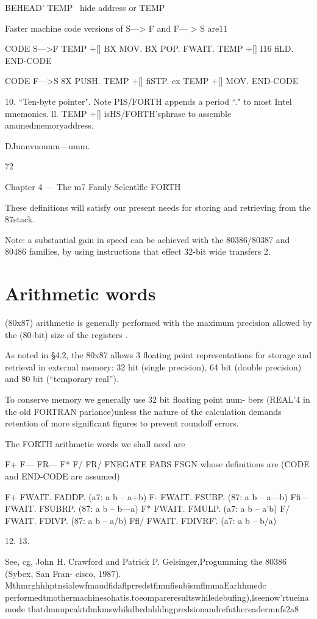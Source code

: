 {{BEHEAD' TEMP \ hide address or TEMP

Faster machine code versions of S—> F and F— > S are11

CODE S—>F TEMP +[] BX MOV. BX POP.
FWAIT. TEMP +[] I16 fiLD. END-CODE

CODE F—>S 8X PUSH. TEMP +[] fiSTP.
ex TEMP +[] MOV. END-CODE

 

10. “Ten-byte pointer". Note PIS/FORTH appends a period “." to most Intel mnemonics.
ll. TEMP +[] isHS/FORTH’sphrase to assemble anamedmemoryaddress.

DJunnvuounm—umm.

72

Chapter 4 — The m7 Famly Sclentlflc FORTH

These definitions will satisfy our present needs for storing and
retrieving from the 87stack.

Note: a substantial gain in speed can be achieved with the
80386/80387 and 80486 families, by using instructions that effect
32-bit wide transfers 2.

\section{Arithmetic words}

 (80x87) arithmetic is generally performed with the
maximum precision allowed by the (80-bit) size of the
registers .

As noted in §4.2, the 80x87 allows 3 floating point representations
for storage and retrieval in external memory: 32 hit (single precision),
64 bit (double precision) and 80 bit (“temporary real”).

To conserve memory we generally use 32 bit floating point num-
bers (REAL'4 in the old FORTRAN parlance)unless the nature
of the calculation demands retention of more significant figures
to prevent roundoff errors.

The FORTH arithmetic words we shall need are

F+ F— FR— F* F/ FR/ FNEGATE FABS FSGN
whose definitions are (CODE and END-CODE are assumed)

F+ FWAIT. FADDP. (a7: a b -- a+b)
F- FWAIT. FSUBP. (87: a b -- a—b)
Ffi— FWAIT. FSUBRP. (87: a b -- b—a)
F* FWAIT. FMULP. (a7: a b -- a'b)
F/ FWAIT. FDIVP. (87: a b -- a/b)
Ffl/ FWAIT. FDIVRF’. (a7: a b -- b/a)

 

12.
13.

See, cg, John H. Crawford and Patrick P. Gelsinger,Progumming the 80386 (Sybex, San Fran-
cisco, 1987).
MthmrghhhptnsialewfmaudfidaflprredstfimnfisubismflmmaEarhhmedc
performedtmothermachinesohatis.toeompareresultswhiledebufing),lseenow'rtueinamode
thatdmnupcaktdmkmswhikdbrdnhldngpredsionandrefuthereadermnfs2a8

}}
